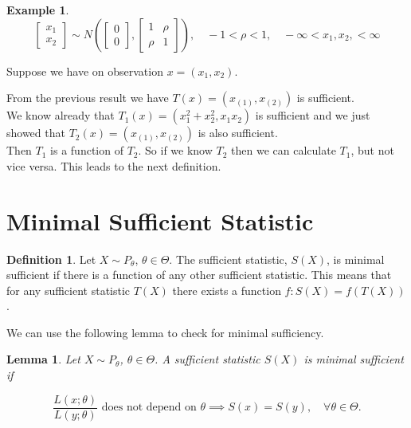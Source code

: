 \documentclass[12pt]{article}
\newtheorem*{lemma}{Lemma}
\theoremstyle{definition}
\newtheorem*{definition}{Definition}
\newtheorem*{example}{Example}
\begin{document}
\begin{example}
\begin{equation*}
\begin{bmatrix}
x_1 \\
x_2
\end{bmatrix} \sim
N \left(
\begin{bmatrix}
0 \\
0
\end{bmatrix}
,
\begin{bmatrix}
1 & \rho \\
\rho & 1
\end{bmatrix}
\right),
\quad
-1 < \rho < 1,
\quad
-\infty < x_1, x_2, < \infty
\end{equation*}

Suppose we have on observation $x = (x_1, x_2)$.

From the previous result we have $T(x) = (x_{(1)}, x_{(2)})$ is
sufficient. \\

We know already that $T_1(x) = (x_1^2 + x_2^2, x_1 x_2)$ is sufficient and
we just showed that $T_2(x) = (x_{(1)}, x_{(2)})$ is also sufficient. \\

Then $T_1$ is a function of $T_2$. So if we know $T_2$ then we can calculate
$T_1$, but not vice versa. This leads to the next definition.
\end{example}

\section{Minimal Sufficient Statistic}

\begin{definition}
Let $X \sim P_{\theta}$, $\theta \in \Theta$. The sufficient statistic, $S(X)$, 
is minimal sufficient if there is a function of any other sufficient statistic.
This means that for any sufficient statistic $T(X)$ there exists a function
$f:S(X) = f(T(X))$.
\end{definition}

We can use the following lemma to check for minimal sufficiency.

\begin{lemma}
Let $X \sim P_{\theta}$, $\theta \in \Theta$. A sufficient statistic $S(X)$
is minimal sufficient if

\begin{equation*}
\frac{L(x; \theta)}{L(y; \theta)} \text{ does not depend on } \theta \implies
S(x) = S(y), \quad \forall \theta \in \Theta.
\end{equation*}
\end{lemma}
\end{document}
